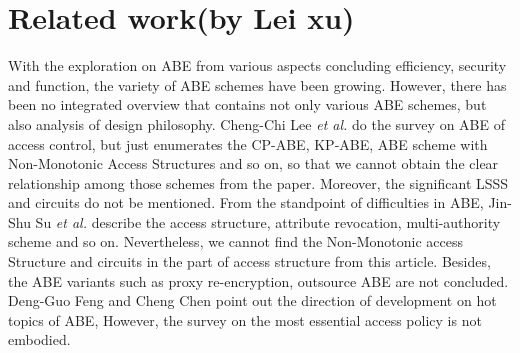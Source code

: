 \section{Related work(by Lei xu)}
With the exploration on ABE from various aspects concluding efficiency, security and function,
the variety of ABE schemes have been growing.
However, there has been no integrated overview that contains not only various ABE schemes,
but also analysis of design philosophy.
Cheng-Chi Lee \emph{et al.} \cite{Lee:JNS'13} do the survey on ABE of access control,
but just enumerates the CP-ABE, KP-ABE, ABE scheme with Non-Monotonic Access Structures and so on,
so that we cannot obtain the clear relationship among those schemes from the paper.
Moreover, the significant LSSS and circuits do not be mentioned.
From the standpoint of difficulties in ABE,
Jin-Shu Su \emph{et al.} \cite{Su:JS'11} describe the access structure, attribute revocation, multi-authority scheme and so on.
Nevertheless, we cannot find the Non-Monotonic access Structure and circuits in the part of access structure from this article.
Besides, the ABE variants such as proxy re-encryption, outsource ABE are not concluded.
Deng-Guo Feng and Cheng Chen \cite{Feng:jcr'14} point out the direction of development on hot topics of ABE,
However, the survey on the most essential access policy is not embodied.



